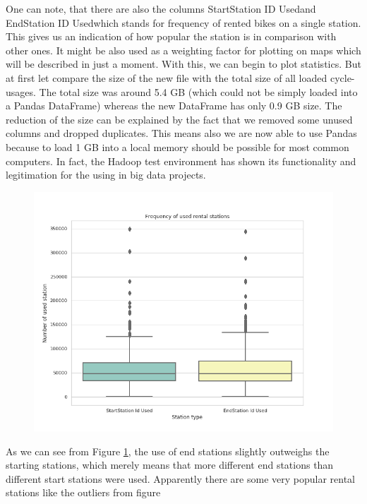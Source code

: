 \documentclass[12pt]{article}
\begin{document}
One can note, that there are also the columns \glqq StartStation ID Used\grqq and \glqq EndStation ID Used\grqq which stands for frequency of rented bikes on a single station. This gives us an indication of how
popular the station is in comparison with other ones. It might be also used as a weighting factor
for plotting on maps which will be described in just a moment.
With this, we can begin to plot statistics. But at first let compare the size of the new file with the
total size of all loaded cycle-usages. The total size was around 5.4 GB (which could not be simply
loaded into a Pandas DataFrame) whereas the new DataFrame has only 0.9 GB size. The reduction
of the size can be explained by the fact that we removed some unused columns and dropped
duplicates. This means also we are now able to use Pandas because to load 1 GB into a local
memory should be possible for most common computers. In fact, the Hadoop test environment
has shown its functionality and legitimation for the using in big data projects.
\begin{figure}[H]
\hspace{-0.8cm}
\includegraphics[width=1.1\textwidth]{img/plot1}
\label{pic:plot1}
\end{figure}
\noindent As we can see from Figure \ref{pic:plot1}, the use of end stations slightly outweighs the starting stations,
which merely means that more different end stations than different start stations
were used. Apparently there are some very popular rental stations like the outliers from figure
\end{document}
